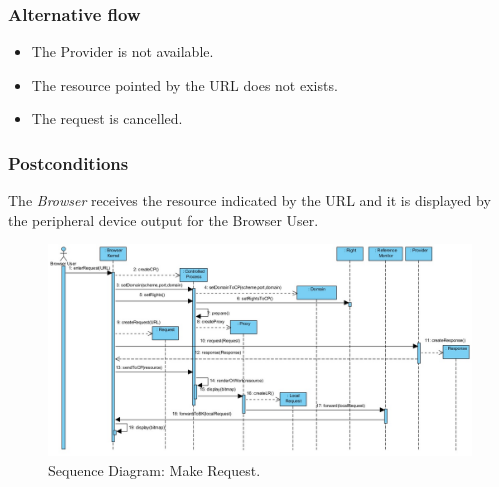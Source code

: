 \documentclass{sig-alternate-05-2015}
\begin{document}
    \subsubsection*{Alternative flow} 
    \begin{itemize}
    \item The Provider is not available.
    \item The resource pointed by the URL does not exists.
    \item The request is cancelled.
      \end{itemize}
    \subsubsection*{Postconditions} The \textit{Browser} receives the resource indicated by the URL and it is displayed by the peripheral device output for the Browser User.
    \begin{landscape}
      \begin{figure}[h!t]
          \centering
          \hspace*{-7cm}\includegraphics[scale=0.75]{figures/MakeRequest_v8.jpg}
          \caption{Sequence Diagram: Make Request.}
          \label{fig:SecReq}
      \end{figure}
    \end{landscape}
\end{document}
